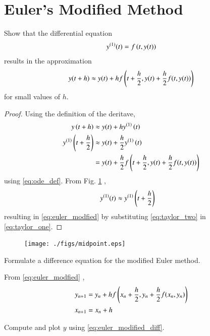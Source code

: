 \documentclass[journal,12pt,twocolumn]{IEEEtran}
\begin{document}
\section{Euler's Modified Method}
\begin{problem}
Show that the differential equation
\begin{align}
\label{eq:ode_def}
y^{(1)}(t) = f\left(t,y(t)\right)
\end{align}
results in the approximation
\begin{equation}
\label{eq:euler_modfied}
y(t+h) \approx y(t) + h f\left(t + \frac{h}{2}, y(t)+ \frac{h}{2}f(t,y(t))\right)
\end{equation}
for small values of $h$.
\end{problem}
\begin{proof}
Using the definition of the deritave,
%
\begin{align}
\label{eq:taylor_one}
y\left(t + h\right) &\approx y(t) + hy^{(1)}\left(t\right)
\\
y^{(1)}\left(t+\frac{h}{2}\right) &\approx  y(t) + \frac{h}{2}y^{(1)}\left(t\right)
\\
&=y(t) + \frac{h}{2}f\left(t + \frac{h}{2}, y(t)+ \frac{h}{2}f(t,y(t))\right)
\label{eq:taylor_two}
\end{align}
using \eqref{eq:ode_def}.
From Fig. \ref{fig:midpoint} \cite{midpoint}, 
\begin{align}
y^{(1)}(t) &\approx y^{(1)}\left(t+\frac{h}{2}\right)
\end{align}
resulting in \eqref{eq:euler_modfied} by substituting \eqref{eq:taylor_two} in \eqref{eq:taylor_one}.
\end{proof}
%
\begin{figure}[!h]
\centering
\texttt{[image: ./figs/midpoint.eps]}
\caption{}
\label{fig:midpoint}
\end{figure}
%
\begin{problem}
Formulate a difference equation for the modified Euler method.
\end{problem}
\solution From \eqref{eq:euler_modfied} \cite{midpoint},
\begin{align}
\label{eq:euler_modified_diff}
y_{n+1} &= y_n + h f\left(x_n + \frac{h}{2}, y_n+ \frac{h}{2}f(x_n,y_n)\right)
\\
x_{n+1} &= x_n + h
\end{align}
\begin{problem}
Compute and plot $y$ using \eqref{eq:euler_modified_diff}.
\end{problem}
\end{document}

